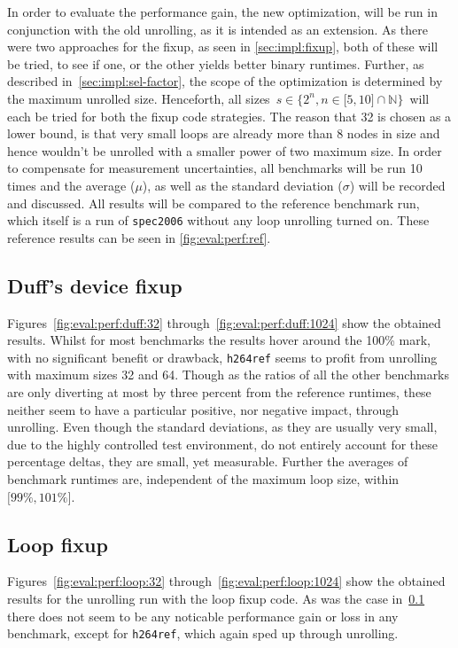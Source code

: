 In order to evaluate the performance gain, the new optimization, will be run in conjunction with the old unrolling, as it is intended as an extension.
As there were two approaches for the fixup, as seen in \cref{sec:impl:fixup}, both of these will be tried, to see if one, or the other yields better binary runtimes.
Further, as described in~\cref{sec:impl:sel-factor}, the scope of the optimization is determined by the maximum unrolled size.
Henceforth, all sizes~$s \in \{2^n, n \in \lbrack 5, 10 \rbrack \cap \mathbb{N}\}$~will each be tried for both the fixup code strategies.
The reason that 32 is chosen as a lower bound, is that very small loops are already more than 8 nodes in size and hence wouldn't be unrolled with a smaller power of two maximum size.
In order to compensate for measurement uncertainties, all benchmarks will be run 10 times and the average ($\mu$), as well as the standard deviation ($\sigma$) will be recorded and discussed.
All results will be compared to the reference benchmark run, which itself is a run of \texttt{spec2006} without any loop unrolling turned on.
These reference results can be seen in \cref{fig:eval:perf:ref}.



\subsection{Duff's device fixup}\label{sec:eval:perf:duff}



Figures~\ref{fig:eval:perf:duff:32} through~\ref{fig:eval:perf:duff:1024} show the obtained results.
Whilst for most benchmarks the results hover around the 100\% mark, with no significant benefit or drawback, \texttt{h264ref} seems to profit from unrolling with maximum sizes 32 and 64.
Though as the ratios of all the other benchmarks are only diverting at most by three percent from the reference runtimes, these neither seem to have a particular positive, nor negative impact, through unrolling.
Even though the standard deviations, as they are usually very small, due to the highly controlled test environment, do not entirely account for these percentage deltas, they are small, yet measurable.
Further the averages of benchmark runtimes are, independent of the maximum loop size, within $\lbrack 99\%, 101\% \rbrack$.

\subsection{Loop fixup}\label{sec:eval:perf:loop}



Figures~\ref{fig:eval:perf:loop:32} through~\ref{fig:eval:perf:loop:1024} show the obtained results for the unrolling run with the loop fixup code.
As was the case in~\cref{sec:eval:perf:duff} there does not seem to be any noticable performance gain or loss in any benchmark, except for \texttt{h264ref}, which again sped up through unrolling.
